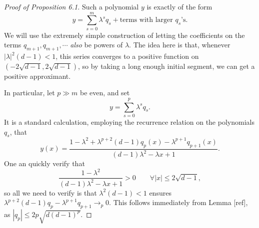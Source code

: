 \begin{proof}[Proof of Proposition 6.1]
    Such a polynomial $y$ is exactly of the form
    $$
        y = \sum_{s = 0}^m \lambda^s q_s + \text{terms with larger $q_s$'s}.
    $$
    We will use the extremely simple construction of letting the coefficients on the terms $q_{m+1},q_{m+1}, \cdots$ \emph{also} be powers of $\lambda$. The idea here is that, whenever $|\lambda|^2(d-1) < 1$, this series converges to a positive function on $(-2\sqrt{d-1},2\sqrt{d-1})$, so by taking a long enough initial segment, we can get a positive approximant. 

    In particular, let $p \gg m$ be even, and set
    $$
        y = \sum_{s = 0}^p \lambda^s q_s.
    $$
    It is a standard calculation, employing the recurrence relation on the polynomials $q_s$, that
    $$
        y(x) = \frac{1 - \lambda^2 + \lambda^{p+2}(d-1)q_p(x) - \lambda^{p+1}q_{p+1}(x)}{(d-1)\lambda^2 - \lambda x + 1}.
    $$
    One an quickly verify that
    $$
        \frac{1 - \lambda^2}{(d-1)\lambda^2 - \lambda x + 1} > 0 \qquad \forall |x| \le 2\sqrt{d-1},
    $$
    so all we need to verify is that $\lambda^2(d-1) < 1$ ensures $\lambda^{p+2}(d-1)q_p - \lambda^{p+1}q_{p+1} \to_p 0$. This follows immediately from Lemma [ref], as $|q_p| \le 2p\sqrt{d(d-1)^p}$.
\end{proof}

